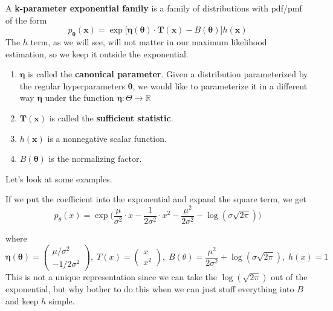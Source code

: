   \begin{definition}
    \label{def:exponential-family}
    A \textbf{k-parameter exponential family} is a family of distributions with pdf/pmf of the form 
    \begin{equation}
      p_{\boldsymbol{\theta}} (\mathbf{x}) = \exp\big[ \boldsymbol{\eta}(\boldsymbol{\theta}) \cdot \mathbf{T}(\mathbf{x}) - B(\boldsymbol{\theta}) \big] h(\mathbf{x})
    \end{equation}
    The $h$ term, as we will see, will not matter in our maximum likelihood estimation, so we keep it outside the exponential. 
    \begin{enumerate}
      \item $\boldsymbol{\eta}$ is called the \textbf{canonical parameter}. Given a distribution parameterized by the regular hyperparameters $\boldsymbol{\theta}$, we would like to parameterize it in a different way $\boldsymbol{\eta}$ under the function $\boldsymbol{\eta}: \Theta \rightarrow \mathbb{R}$
      \item $\mathbf{T}(\mathbf{x})$ is called the \textbf{sufficient statistic}. 
      \item $h(\mathbf{x})$ is a nonnegative scalar function. 
      \item $B(\boldsymbol{\theta})$ is the normalizing factor. 
    \end{enumerate}
  \end{definition}

  Let's look at some examples. 

  \begin{example}[Gaussian]
    \label{ex:gaussian}
    If we put the coefficient into the exponential and expand the square term, we get 
    \begin{equation}
      p_\theta (x) = \exp \bigg( \frac{\mu}{\sigma^2} \cdot x - \frac{1}{2\sigma^2} \cdot x^2 - \frac{\mu^2}{2 \sigma^2} - \log ( \sigma \sqrt{2 \pi}) \bigg)
    \end{equation}
     
    where 
    \begin{equation}
      \boldsymbol{\eta}(\boldsymbol{\theta}) = \begin{pmatrix} \mu /\sigma^2 \\ -1 / 2 \sigma^2 \end{pmatrix}, \; T(x) = \begin{pmatrix} x \\ x^2 \end{pmatrix}, \; B(\theta) = \frac{\mu^2}{2 \sigma^2} + \log(\sigma \sqrt{2 \pi}), \; h(x) = 1
    \end{equation}
    This is not a unique representation since we can take the $\log(\sqrt{2 \pi})$ out of the exponential, but why bother to do this when we can just stuff everything into $B$ and keep $h$ simple. 
  \end{example}

